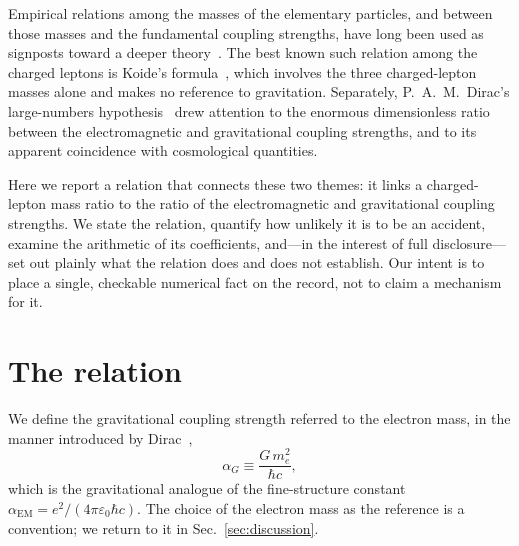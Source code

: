 \documentclass[aps,prd,twocolumn,amsmath,amssymb,floatfix,nofootinbib]{revtex4-2}
\begin{document}
Empirical relations among the masses of the elementary particles, and between
those masses and the fundamental coupling strengths, have long been used as
signposts toward a deeper theory~\cite{koide1983,dirac1938,wesson1980}. The
best known such relation among the charged leptons is Koide's
formula~\cite{koide1983}, which involves the three charged-lepton masses alone
and makes no reference to gravitation. Separately, P.~A.~M.~Dirac's
large-numbers hypothesis~\cite{dirac1938} drew attention to the enormous
dimensionless ratio between the electromagnetic and gravitational coupling
strengths, and to its apparent coincidence with cosmological quantities.

Here we report a relation that connects these two themes: it links a
charged-lepton mass ratio to the ratio of the electromagnetic and
gravitational coupling strengths. We state the relation, quantify how unlikely
it is to be an accident, examine the arithmetic of its coefficients, and---in
the interest of full disclosure---set out plainly what the relation does and
does not establish. Our intent is to place a single, checkable numerical fact
on the record, not to claim a mechanism for it.

\section{The relation}

We define the gravitational coupling strength referred to the electron mass,
in the manner introduced by Dirac~\cite{dirac1938},
\begin{equation}
\alpha_G \equiv \frac{G\,m_e^2}{\hbar c},
\label{eq:alphaG}
\end{equation}
which is the gravitational analogue of the fine-structure constant
$\alpha_{\mathrm{EM}} = e^2/(4\pi\varepsilon_0\hbar c)$. The choice of the
electron mass as the reference is a convention; we return to it in
Sec.~\ref{sec:discussion}.
\end{document}
